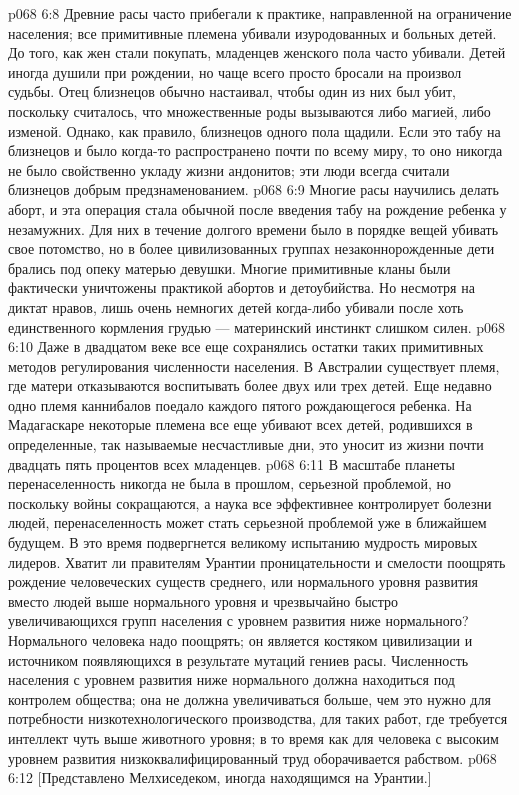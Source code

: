 \vs p068 6:8 Древние расы часто прибегали к практике, направленной на ограничение населения; все примитивные племена убивали изуродованных и больных детей. До того, как жен стали покупать, младенцев женского пола часто убивали. Детей иногда душили при рождении, но чаще всего просто бросали на произвол судьбы. Отец близнецов обычно настаивал, чтобы один из них был убит, поскольку считалось, что множественные роды вызываются либо магией, либо изменой. Однако, как правило, близнецов одного пола щадили. Если это табу на близнецов и было когда\hyp{}то распространено почти по всему миру, то оно никогда не было свойственно укладу жизни андонитов; эти люди всегда считали близнецов добрым предзнаменованием.
\vs p068 6:9 Многие расы научились делать аборт, и эта операция стала обычной после введения табу на рождение ребенка у незамужних. Для них в течение долгого времени было в порядке вещей убивать свое потомство, но в более цивилизованных группах незаконнорожденные дети брались под опеку матерью девушки. Многие примитивные кланы были фактически уничтожены практикой абортов и детоубийства. Но несмотря на диктат нравов, лишь очень немногих детей когда\hyp{}либо убивали после хоть единственного кормления грудью --- материнский инстинкт слишком силен.
\vs p068 6:10 Даже в двадцатом веке все еще сохранялись остатки таких примитивных методов регулирования численности населения. В Австралии существует племя, где матери отказываются воспитывать более двух или трех детей. Еще недавно одно племя каннибалов поедало каждого пятого рождающегося ребенка. На Мадагаскаре некоторые племена все еще убивают всех детей, родившихся в определенные, так называемые несчастливые дни, это уносит из жизни почти двадцать пять процентов всех младенцев.
\vs p068 6:11 \pc В масштабе планеты перенаселенность никогда не была в прошлом, серьезной проблемой, но поскольку войны сокращаются, а наука все эффективнее контролирует болезни людей, перенаселенность может стать серьезной проблемой уже в ближайшем будущем. В это время подвергнется великому испытанию мудрость мировых лидеров. Хватит ли правителям Урантии проницательности и смелости поощрять рождение человеческих существ среднего, или нормального уровня развития вместо людей выше нормального уровня и чрезвычайно быстро увеличивающихся групп населения с уровнем развития ниже нормального? Нормального человека надо поощрять; он является костяком цивилизации и источником появляющихся в результате мутаций гениев расы. Численность населения с уровнем развития ниже нормального должна находиться под контролем общества; она не должна увеличиваться больше, чем это нужно для потребности низкотехнологического производства, для таких работ, где требуется интеллект чуть выше животного уровня; в то время как для человека с высоким уровнем развития низкоквалифицированный труд оборачивается рабством.
\vsetoff
\vs p068 6:12 [Представлено Мелхиседеком, иногда находящимся на Урантии.]
